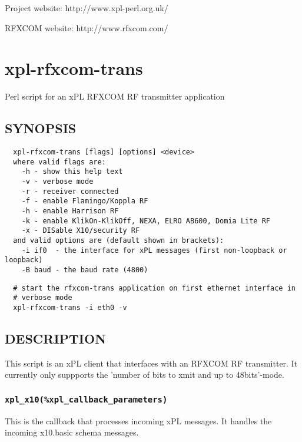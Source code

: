 \documentclass[12pt,a4paper]{article}
\begin{document}
Project website: http://www.xpl-perl.org.uk/



RFXCOM website: http://www.rfxcom.com/

\newpage
\section{xpl-rfxcom-trans\label{xpl-rfxcom-trans}}


Perl script for an xPL RFXCOM RF transmitter application

\subsection*{SYNOPSIS\label{xpl-rfxcom-trans_SYNOPSIS}}
\begin{verbatim}
  xpl-rfxcom-trans [flags] [options] <device>
  where valid flags are:
    -h - show this help text
    -v - verbose mode
    -r - receiver connected
    -f - enable Flamingo/Koppla RF
    -h - enable Harrison RF
    -k - enable KlikOn-KlikOff, NEXA, ELRO AB600, Domia Lite RF
    -x - DISable X10/security RF
  and valid options are (default shown in brackets):
    -i if0  - the interface for xPL messages (first non-loopback or loopback)
    -B baud - the baud rate (4800)
\end{verbatim}
\begin{verbatim}
  # start the rfxcom-trans application on first ethernet interface in
  # verbose mode
  xpl-rfxcom-trans -i eth0 -v
\end{verbatim}
\subsection*{DESCRIPTION\label{xpl-rfxcom-trans_DESCRIPTION}}


This script is an xPL client that interfaces with an RFXCOM RF
transmitter.  It currently only suppports the 'number of bits to xmit
and up to 48bits'-mode.

\subsubsection*{\texttt{xpl\_x10(\%xpl\_callback\_parameters)}\label{xpl-rfxcom-trans_xpl_x10_xpl_callback_parameters_}}


This is the callback that processes incoming xPL messages.  It handles
the incoming x10.basic schema messages.
\end{document}
